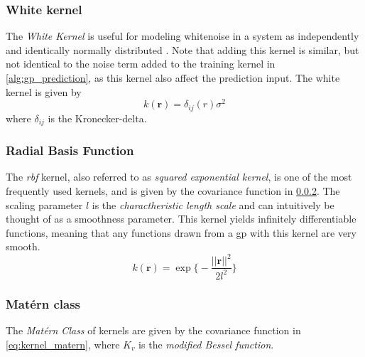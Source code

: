 \subsubsection{White kernel}
The \textit{White Kernel} is useful for modeling whitenoise in a system as independently and identically normally distributed \cite{scikit-learn}. Note that adding this kernel is similar, but not identical to the noise term added to the training kernel in \cref{alg:gp_prediction}, as this kernel also affect the prediction input. The white kernel is given by
\begin{equation}
    k(\boldsymbol{r}) = \delta_{ij} (r) \sigma^2
\end{equation}
where $\delta_{ij}$ is the Kronecker-delta.

\subsubsection{Radial Basis Function}\label{sec:kernels_rbf}
The \textit{\acrfull{rbf}} kernel, also referred to as \textit{squared exponential kernel}, is one of the most frequently used kernels, and is given by the covariance function in \cref{sec:kernels_rbf}. The scaling parameter $l$ is the \textit{charactheristic length scale} and can intuitively be thought of as a smoothness parameter. This kernel yields infinitely differentiable functions, meaning that any functions drawn from a \acrshort{gp} with this kernel are very smooth\cite{rasmussen}.
\begin{equation}\label{eq:kernel_rbf}
    k(\boldsymbol{r}) = \exp \big\{-\frac{||\boldsymbol{r}||^2}{2 l^2}\big\}
\end{equation} 

\subsubsection{Matérn class}
The \textit{Matérn Class} of kernels are given by the covariance function in \cref{eq:kernel_matern}, where $K_v$ is the \textit{modified Bessel function}. 

